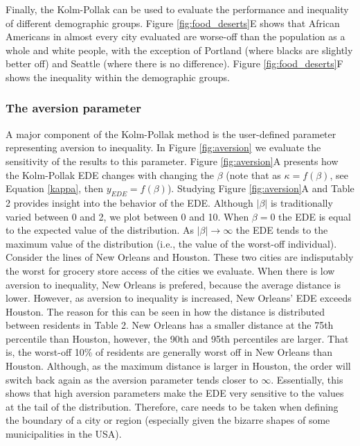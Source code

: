 \documentclass[final,3p,times,onecolumn,sort&compress]{elsarticle}
\begin{document}
Finally, the Kolm-Pollak can be used to evaluate the performance and inequality of different demographic groups.
Figure \ref{fig:food_deserts}E shows that African Americans in almost every city evaluated are worse-off than the population as a whole and white people, with the exception of Portland (where blacks are slightly better off) and Seattle (where there is no difference). 
Figure \ref{fig:food_deserts}F shows the inequality within the demographic groups.

\subsubsection{The aversion parameter}
A major component of the Kolm-Pollak method is the user-defined parameter representing aversion to inequality.
In Figure \ref{fig:aversion} we evaluate the sensitivity of the results to this parameter.
Figure \ref{fig:aversion}A presents how the Kolm-Pollak EDE changes with changing the $\beta$ (note that as $\kappa=f(\beta)$, see Equation \ref{kappa}, then $y_{EDE}=f(\beta)$).
Studying Figure \ref{fig:aversion}A and Table 2 provides insight into the behavior of the EDE.
Although $\left|\beta\right|$ is traditionally varied between 0 and 2, we plot between 0 and 10.
When $\beta=0$ the EDE is equal to the expected value of the distribution.
As $\left|\beta\right| \rightarrow \infty$ the EDE tends to the maximum value of the distribution (i.e., the value of the worst-off individual).
Consider the lines of New Orleans and Houston.
These two cities are indisputably the worst for grocery store access of the cities we evaluate.
When there is low aversion to inequality, New Orleans is prefered, because the average distance is lower.
However, as aversion to inequality is increased, New Orleans' EDE exceeds Houston.
The reason for this can be seen in how the distance is distributed between residents in Table 2.
New Orleans has a smaller distance at the 75th percentile than Houston, however, the 90th and 95th percentiles are larger.
That is, the worst-off 10\% of residents are generally worst off in New Orleans than Houston.
Although, as the maximum distance is larger in Houston, the order will switch back again as the aversion parameter tends closer to $\infty$.
Essentially, this shows that high aversion parameters make the EDE very sensitive to the values at the tail of the distribution.
Therefore, care needs to be taken when defining the boundary of a city or region (especially given the bizarre shapes of some municipalities in the USA).
\end{document}

